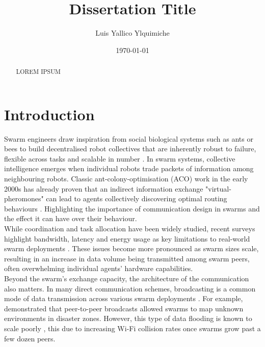 \documentclass[conference]{IEEEtran}
\title{Dissertation Title}
\author{Luis Yallico Ylquimiche}
\date{\today}
\begin{document}
\maketitle

\begin{abstract}
LOREM IPSUM
\end{abstract}


\section{Introduction}

Swarm engineers draw inspiration from social biological systems such as ants or bees to build decentralised robot collectives that are inherently robust to failure, flexible across tasks and scalable in number \cite{dias_swarm_2021}. In swarm systems, collective intelligence emerges when individual robots trade packets of information among neighbouring robots. Classic ant-colony-optimisation (ACO) work in the early 2000s has already proven that an indirect information exchange "virtual-pheromones" can lead to agents collectively discovering optimal routing behaviours \cite{dorigo_ant_2000}. Highlighting the importance of communication design in swarms and the effect it can have over their behaviour.\\

While coordination and task allocation have been widely studied, recent surveys highlight bandwidth, latency and energy usage as key limitations to real-world swarm deployments \cite{an_multi-robot_2023}\cite{ding_advancements_2023}. These issues become more pronounced as swarm sizes scale, resulting in an increase in data volume being transmitted among swarm peers, often overwhelming individual agents' hardware capabilities.\\

Beyond the swarm's exchange capacity, the architecture of the communication also matters. In many direct communication schemes, broadcasting is a common mode of data transmission across various swarm deployments \cite{an_multi-robot_2023}. For example,\cite{perrin_decentralised_2012} demonstrated that peer-to-peer broadcasts allowed swarms to map unknown environments in disaster zones. However, this type of data flooding is known to scale poorly \cite{an_multi-robot_2023}, this due to increasing Wi-Fi collision rates once swarms grow past a few dozen peers.\\ 
\end{document}
